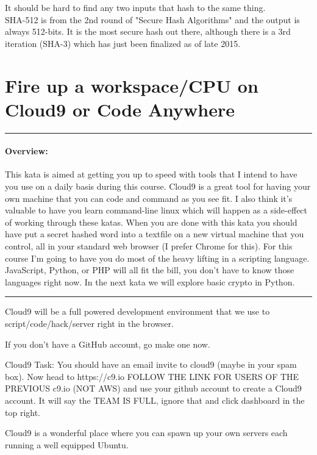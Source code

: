 \documentclass[12pt]{article}
\newenvironment{task}[1][Task:]{ %
    \medskip
    \begin{mdframed}[style=info]
        \noindent{\textbf{#1}}
}{
    \end{mdframed}
}
\newenvironment{overview}
  {\noindent\rule{\textwidth}{0.4pt}
  \paragraph{Overview:}
  }
  {\par
  \noindent\rule{\textwidth}{0.4pt}
  }
\begin{document}
    It should be hard to find any two inputs that hash to the same thing.\\

SHA-512 is from the 2nd round of "Secure Hash Algorithms" and the output is always 512-bits. It is the most secure hash out there, although there is a 3rd iteration (SHA-3) which has just been finalized as of late 2015.\\

\section{Fire up a workspace/CPU on Cloud9 or Code Anywhere}

\begin{overview}
This kata is aimed at getting you up to speed with tools that I intend to have you use on a daily basis during this course. Cloud9 is a great tool for having your own machine that you can code and command as you see fit. I also think it's valuable to have you learn command-line linux which will happen as a side-effect of working through these katas. When you are done with this kata you should have put a secret hashed word into a textfile on a new virtual machine that you control, all in your standard web browser (I prefer Chrome for this). For this course I'm going to have you do most of the heavy lifting in a scripting language. JavaScript, Python, or PHP will all fit the bill, you don't have to know those languages right now. In the next kata we will explore basic crypto in Python.
\end{overview}

Cloud9 will be a full powered development environment that we use to script/code/hack/server right in the browser.

\begin{task}[Login to Github]
If you don't have a GitHub account, go make one now.
\end{task}

\begin{task}[Cloud9 Task:]
Cloud9 Task: You should have an email invite to cloud9 (maybe in your spam box). Now head to https://c9.io FOLLOW THE LINK FOR USERS OF THE PREVIOUS c9.io (NOT AWS) and use your github account to create a Cloud9 account. It will say the TEAM IS FULL, ignore that and click dashboard in the top right.
\end{task}

Cloud9 is a wonderful place where you can spawn up your own servers each running a well equipped Ubuntu.
\end{document}
